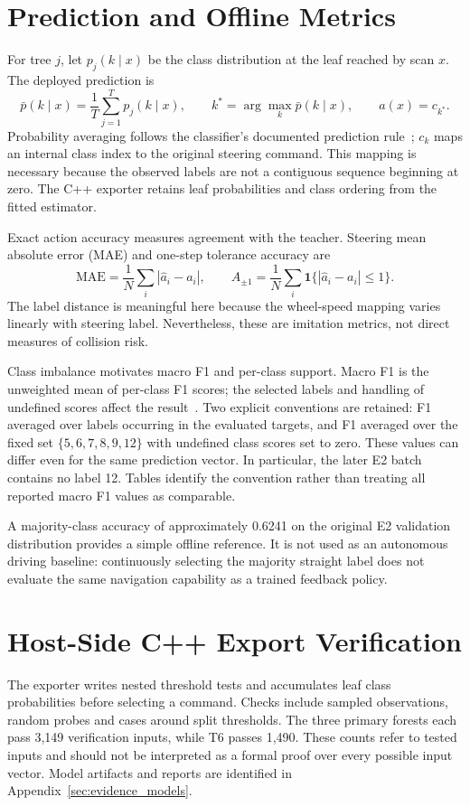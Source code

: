 \section{Prediction and Offline Metrics}
For tree $j$, let $p_j(k\mid x)$ be the class distribution at the leaf reached
by scan $x$. The deployed prediction is
\begin{equation}
 \bar p(k\mid x)=\frac{1}{T}\sum_{j=1}^{T}p_j(k\mid x),\qquad
 k^*=\arg\max_k \bar p(k\mid x),\qquad \hat a(x)=c_{k^*}.
\end{equation}
Probability averaging follows the classifier's documented prediction
rule~\cite{sklearnForest}; $c_k$ maps an internal class index to the original steering command.
This mapping is necessary because the observed labels are not a contiguous
sequence beginning at zero. The C++ exporter retains leaf probabilities and
class ordering from the fitted estimator.

Exact action accuracy measures agreement with the teacher. Steering mean
absolute error (MAE) and one-step tolerance accuracy are
\begin{equation}
 \mathrm{MAE}=\frac{1}{N}\sum_i|\hat a_i-a_i|,\qquad
 A_{\pm1}=\frac{1}{N}\sum_i\mathbf{1}\{|\hat a_i-a_i|\leq1\}.
\end{equation}
The label distance is meaningful here because the wheel-speed mapping varies
linearly with steering label. Nevertheless, these are imitation metrics,
not direct measures of collision risk.

Class imbalance motivates macro F1 and per-class support. Macro F1 is the
unweighted mean of per-class F1 scores; the selected labels and handling of
undefined scores affect the result~\cite{sklearnF1}. Two explicit
conventions are retained: F1 averaged over labels occurring in the evaluated
targets, and F1 averaged over the fixed set $\{5,6,7,8,9,12\}$ with undefined
class scores set to zero. These values can differ even for the same prediction
vector. In particular, the later E2 batch contains no label 12. Tables identify
the convention rather than treating all reported macro F1 values as comparable.

A majority-class accuracy of approximately 0.6241 on the original E2
validation distribution provides a simple offline reference. It is not used
as an autonomous driving baseline: continuously selecting the majority
straight label does not evaluate the same navigation capability as a trained
feedback policy.

\section{Host-Side C++ Export Verification}
The exporter writes nested threshold tests and accumulates leaf class
probabilities before selecting a command. Checks include sampled observations,
random probes and cases around split thresholds. The three primary forests
each pass 3,149 verification inputs, while T6 passes 1,490. These counts refer
to tested inputs and should not be interpreted as a formal proof over every
possible input vector. Model artifacts and reports are identified in
Appendix~\ref{sec:evidence_models}.

